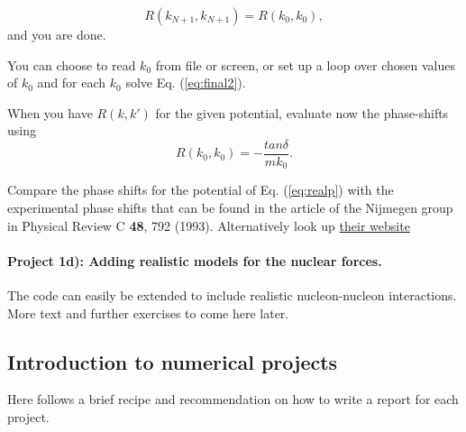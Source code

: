 \documentclass[%
oneside,                 %
final,                   %
10pt]{article}
\begin{document}
\begin{equation}
      R(k_{N+1},k_{N+1})=R(k_0,k_0),
\end{equation}
and you are done.

You can choose to read $k_0$ from file or screen, or set up
a loop over chosen values of $k_0$ and for each
$k_0$ solve Eq. (\ref{eq:final2}). 




When you have $R(k,k')$ for the given potential, evaluate now the phase-shifts  using
\begin{equation*}
R(k_0,k_0)=-\frac{tan\delta}{mk_0}.
\end{equation*}

Compare the phase shifts for the potential of Eq. (\ref{eq:realp}) with the  experimental phase shifts that can be found  in the article  of the Nijmegen group in Physical Review C \textbf{48}, 792 (1993).  Alternatively look up \href{{http://nn-online.org/}}{their website}


\paragraph{Project 1d): Adding realistic models for the nuclear forces.}
The code can easily be extended to include realistic nucleon-nucleon interactions. More text and further exercises to come here later.







\subsection{Introduction to numerical projects}

Here follows a brief recipe and recommendation on how to write a report for each
project.
\end{document}

